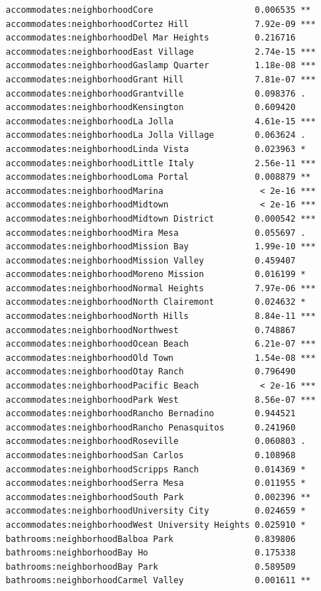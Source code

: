 \documentclass[
  letterpaper,
  DIV=11,
  numbers=noendperiod,
  oneside]{scrreprt}
\begin{document}
\begin{verbatim}
accommodates:neighborhoodCore                    0.006535 ** 
accommodates:neighborhoodCortez Hill             7.92e-09 ***
accommodates:neighborhoodDel Mar Heights         0.216716    
accommodates:neighborhoodEast Village            2.74e-15 ***
accommodates:neighborhoodGaslamp Quarter         1.18e-08 ***
accommodates:neighborhoodGrant Hill              7.81e-07 ***
accommodates:neighborhoodGrantville              0.098376 .  
accommodates:neighborhoodKensington              0.609420    
accommodates:neighborhoodLa Jolla                4.61e-15 ***
accommodates:neighborhoodLa Jolla Village        0.063624 .  
accommodates:neighborhoodLinda Vista             0.023963 *  
accommodates:neighborhoodLittle Italy            2.56e-11 ***
accommodates:neighborhoodLoma Portal             0.008879 ** 
accommodates:neighborhoodMarina                   < 2e-16 ***
accommodates:neighborhoodMidtown                  < 2e-16 ***
accommodates:neighborhoodMidtown District        0.000542 ***
accommodates:neighborhoodMira Mesa               0.055697 .  
accommodates:neighborhoodMission Bay             1.99e-10 ***
accommodates:neighborhoodMission Valley          0.459407    
accommodates:neighborhoodMoreno Mission          0.016199 *  
accommodates:neighborhoodNormal Heights          7.97e-06 ***
accommodates:neighborhoodNorth Clairemont        0.024632 *  
accommodates:neighborhoodNorth Hills             8.84e-11 ***
accommodates:neighborhoodNorthwest               0.748867    
accommodates:neighborhoodOcean Beach             6.21e-07 ***
accommodates:neighborhoodOld Town                1.54e-08 ***
accommodates:neighborhoodOtay Ranch              0.796490    
accommodates:neighborhoodPacific Beach            < 2e-16 ***
accommodates:neighborhoodPark West               8.56e-07 ***
accommodates:neighborhoodRancho Bernadino        0.944521    
accommodates:neighborhoodRancho Penasquitos      0.241960    
accommodates:neighborhoodRoseville               0.060803 .  
accommodates:neighborhoodSan Carlos              0.108968    
accommodates:neighborhoodScripps Ranch           0.014369 *  
accommodates:neighborhoodSerra Mesa              0.011955 *  
accommodates:neighborhoodSouth Park              0.002396 ** 
accommodates:neighborhoodUniversity City         0.024659 *  
accommodates:neighborhoodWest University Heights 0.025910 *  
bathrooms:neighborhoodBalboa Park                0.839806    
bathrooms:neighborhoodBay Ho                     0.175338    
bathrooms:neighborhoodBay Park                   0.589509    
bathrooms:neighborhoodCarmel Valley              0.001611 ** 

\end{verbatim}
\end{document}
